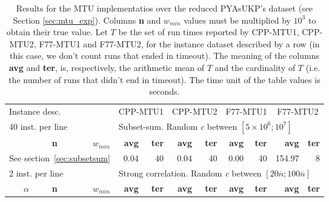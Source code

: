 \begin{table}
\caption{Results for the MTU implementatios over the reduced PYAsUKP's dataset (see Section \ref{sec:mtu_exp}). Columns \textbf{n} and \(w_{min}\) values must be multiplied by \(10^3\) to obtain their true value. Let \(T\) be the set of run times reported by CPP-MTU1, CPP-MTU2, F77-MTU1 and F77-MTU2, for the instance dataset described by a row (in this case, we don't count runs that ended in timeout). The meaning of the columns \textbf{avg} and \textbf{ter}, is, respectively, the arithmetic mean of \(T\) and the cardinality of \(T\) (i.e. the number of runs that didn't end in timeout). The time unit of the table values is seconds.}
\vspace{0.1cm}
\label{tab:times_mtu}
\def\arraystretch{1.1}
\setlength\tabcolsep{6px}

\begin{tabular}{@{\extracolsep{4pt}}rrrrrrrrrrr@{}}

\hline
\multicolumn{3}{l}{Instance desc.} & \multicolumn{2}{c}{CPP-MTU1} & \multicolumn{2}{c}{CPP-MTU2} & \multicolumn{2}{c}{F77-MTU1} & \multicolumn{2}{c}{F77-MTU2}\\
\cline{1-3}\cline{4-5}\cline{6-7}\cline{8-9}\cline{10-11}

\multicolumn{3}{l}{40 inst. per line} & \multicolumn{8}{l}{Subset-sum. Random \emph{c} between \([5\times10^6; 10^7]\)}\\
\cline{1-3}\cline{4-11}

& \textbf{n} & \(w_{min}\) & \textbf{avg} & \textbf{ter}  & \textbf{avg} & \textbf{ter} & \textbf{avg} & \textbf{ter} & \textbf{avg} & \textbf{ter}\\
\cline{1-3}\cline{4-5}\cline{6-7}\cline{8-9}\cline{10-11}

\multicolumn{3}{c}{See section~\ref{sec:subsetsum}} & 0.04 & 40 & 0.04 & 40 & 0.00 & 40 & 154.97 & 8\\
\hline

\multicolumn{3}{l}{2 inst. per line} & \multicolumn{8}{l}{Strong correlation. Random \emph{c} between \([20\overline{n}; 100\overline{n}]\)}\\
\cline{1-3}\cline{4-11}
\textbf{\(\alpha\)} & \textbf{n} & \(w_{min}\) & \textbf{avg} & \textbf{ter}  & \textbf{avg} & \textbf{ter} & \textbf{avg} & \textbf{ter} & \textbf{avg} & \textbf{ter}\\


\end{tabular}
\end{table}
